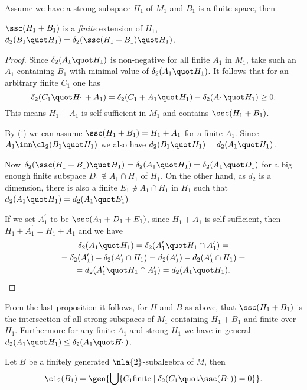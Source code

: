 \begin{prop}
Assume we have a strong subspace $H_{1}$ of $M_{1}$ and $B_{1}$ is a finite space,
then
\begin{itemize}
$\ssc(H_{1}+B_{1})$ is a {\em finite} extension of $H_{1}$,
$d_{2}(B_{1}\quot H_{1})=\delta_{2}(\ssc(H_{1}+B_{1})\quot H_{1})$.
\end{itemize}
\end{prop}
\begin{proof}
Since $\delta_{2}(A_{1}\quot H_{1})$ is non-negative for all finite $A_{1}$ in $M_{1}$, take
such an $A_{1}$ containing $B_{1}$ with minimal value of $\delta_{2}(A_{1}\quot H_{1})$.
It follows that for an arbitrary finite $C_{1}$ one has
$$\delta_{2}(C_{1}\quot H_{1}+A_{1})=\delta_{2}(C_{1}+A_{1}\quot H_{1})-\delta_{2}(A_{1}\quot H_{1})\geq0.$$
This means $H_{1}+A_{1}$ is self-sufficient in $M_{1}$ and contains $\ssc(H_{1}+B_{1})$.

\smallskip
By (i) we can assume $\ssc(H_{1}+B_{1})=H_{1}+A_{1}$ for a finite $A_{1}$. Since
$A_{1}\inn\cl_{2}(B_{1}\quot H_{1})$ we also have $d_{2}(B_{1}\quot H_{1})=d_{2}(A_{1}\quot H_{1})$.

Now $\delta_{2}(\ssc(H_{1}+B_{1})\quot H_{1})=\delta_{2}(A_{1}\quot H_{1})=\delta_{2}(A_{1}\quot D_{1})$
for a big enough finite  subspace $D_{1}\nni A_{1}\cap H_{1}$ of $H_{1}$. On the other hand, as $d_{2}$ is a dimension, there
is also a finite $E_{1}\nni A_{1}\cap H_{1}$ in $H_{1}$ such that $d_{2}(A_{1}\quot H_{1})=d_{2}(A_{1}\quot E_{1})$.

If we set $A_{1}^{\prime}$ to be $\ssc(A_{1}+D_{1}+E_{1})$, since $H_{1}+A_{1}$ is self-sufficient,
then $H_{1}+A_{1}^{\prime}=H_{1}+A_{1}$ and we have 
\begin{multline*}
\delta_{2}(A_{1}\quot H_{1})=\delta_{2}(A_{1}^{\prime}\quot H_{1}\cap A_{1}^{\prime})=\\
=\delta_{2}(A_{1}^{\prime})-
\delta_{2}(A_{1}^{\prime}\cap H_{1})=d_{2}(A_{1}^{\prime})-d_{2}(A_{1}^{\prime}\cap H_{1})=\\
=d_{2}(A_{1}^{\prime}\quot H_{1}\cap A_{1}^{\prime})=d_{2}(A_{1}\quot H_{1}).
\end{multline*}
\end{proof}
From the last proposition it follows, for $H$ and $B$ as above, that $\ssc(H_{1}+B_{1})$ is
the intersection of all strong subspaces of $M_{1}$ containing $H_{1}+B_{1}$ and finite over $H_{1}$.
Furthermore for any finite $A_{1}$ and  strong $H_{1}$ %
we have in general $d_{2}(A_{1}\quot H_{1})\leq\delta_{2}(A_{1}\quot H_{1})$.

\medskip
\begin{lem}
Let $B$ be a finitely generated $\nla{2}$-subalgebra of $M$, then
$$\cl_{2}(B_{1})=\gen{\bigcup\{C_{1} \text{finite}\mid\delta_{2}(C_{1}\quot\ssc(B_{1}))=0\}}.$$
\end{lem}




